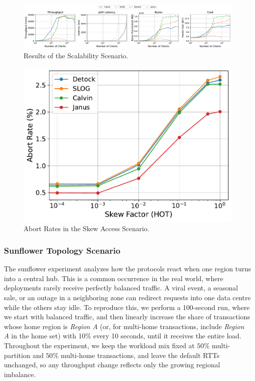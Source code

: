 \begin{figure}[tt]
    \centering
    \includegraphics[width=1\textwidth]{figures/Scalability.pdf}
    \caption{Results of the Scalability Scenario.}
    \label{fig: scalability-access-scenario}
\end{figure}

\begin{figure}[ht]
  \centering
  \includegraphics[width=\columnwidth]{figures/Abort Rates.pdf}
  \caption{Abort Rates in the Skew Access Scenario.}
  \label{fig: abort-rates}
\end{figure}

\subsubsection{Sunflower Topology Scenario}
\label{subsubsec: sunflower-topology-scenario}
The sunflower experiment analyzes how the protocols react when one region turns into a central hub. This is a common occurrence in the real world, where deployments rarely receive perfectly balanced traffic. A viral event, a seasonal sale, or an outage in a neighboring zone can redirect requests into one data centre while the others stay idle. To reproduce this, we perform a 100-second run, where we start with balanced traffic, and then linearly increase the share of transactions whose home region is \textit{Region A} (or, for multi-home transactions, include \textit{Region A} in the home set) with 10\% every 10 seconds, until it receives the entire load. Throughout the experiment, we keep the workload mix fixed at $50\%$ multi-partition and $50\%$ multi-home transactions, and leave the default RTTs unchanged, so any throughput change reflects only the growing regional imbalance.

